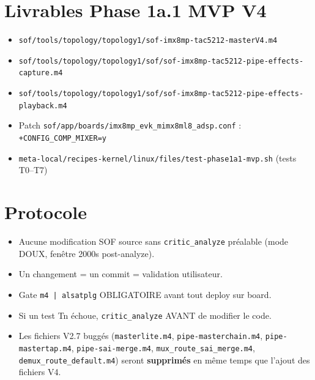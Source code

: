 \documentclass[11pt,a4paper]{article}
\begin{document}
\section{Livrables Phase 1a.1 MVP V4}

\begin{itemize}[leftmargin=*, itemsep=1pt]
  \item \texttt{sof/tools/topology/topology1/sof-imx8mp-tac5212-masterV4.m4}
  \item \texttt{sof/tools/topology/topology1/sof/sof-imx8mp-tac5212-pipe-effects-capture.m4}
  \item \texttt{sof/tools/topology/topology1/sof/sof-imx8mp-tac5212-pipe-effects-playback.m4}
  \item Patch \texttt{sof/app/boards/imx8mp\_evk\_mimx8ml8\_adsp.conf} : \texttt{+CONFIG\_COMP\_MIXER=y}
  \item \texttt{meta-local/recipes-kernel/linux/files/test-phase1a1-mvp.sh} (tests T0--T7)
\end{itemize}

\section{Protocole}

\begin{itemize}[leftmargin=*, itemsep=1pt]
  \item Aucune modification SOF source sans \texttt{critic\_analyze} préalable (mode DOUX, fenêtre 2000s post-analyze).
  \item Un changement = un commit = validation utilisateur.
  \item Gate \texttt{m4 | alsatplg} OBLIGATOIRE avant tout deploy sur board.
  \item Si un test Tn échoue, \texttt{critic\_analyze} AVANT de modifier le code.
  \item Les fichiers V2.7 buggés (\texttt{masterlite.m4}, \texttt{pipe-masterchain.m4}, \texttt{pipe-mastertap.m4}, \texttt{pipe-sai-merge.m4}, \texttt{mux\_route\_sai\_merge.m4}, \texttt{demux\_route\_default.m4}) seront \textbf{supprimés} en même temps que l'ajout des fichiers V4.
\end{itemize}
\end{document}

